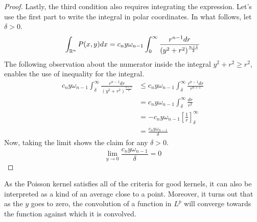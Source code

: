 \begin{proof}
    Lastly, the third condition also requires integrating the expression. Let's use the first part to write the integral in polar coordinates. In what follows, let $\delta>0$.
    \begin{equation*}
        \int_{\mathbb R^n}P(x,y)dx=c_ny\omega_{n-1}\int_0^\infty\frac{r^{n-1}dr}{(y^2+r^2)^{\frac{n+1}{2}}}
    \end{equation*}
    The following observation about the numerator inside the integral $y^2+r^2\geq r^2$, enables the use of inequality for the integral.
    \begin{align*}
        c_ny\omega_{n-1}\int_\delta^\infty\frac{r^{n-1}dr}{(y^2+r^2)^{\frac{n+1}{2}}}&\leq c_ny\omega_{n-1}\int_\delta^\infty\frac{r^{n-1}dr}{r^{n+1}} \\
        &=c_ny\omega_{n-1}\int_\delta^\infty\frac{dr}{r^{2}} \\
        &=-c_ny\omega_{n-1}\left[\frac{1}{r}\right]_\delta^\infty \\
        &=\frac{c_ny\omega_{n-1}}{\delta}
    \end{align*}
    Now, taking the limit shows the claim for any $\delta>0$.
    \begin{equation*}
        \lim_{y\rightarrow0}\frac{c_ny\omega_{n-1}}{\delta}=0
    \end{equation*}
\end{proof}

As the Poisson kernel satisfies all of the criteria for good kernels, it can also be interpreted as a kind of an average close to a point. Moreover, it turns out that as the $y$ goes to zero, the convolution of a function in $L^p$ will converge towards the function against which it is convolved.

\begin{comment}
\begin{lemma}
    If $f\in L^p(\RR^n)$, then $P(\cdot,y)*f$ converges to $f$ in $L^p(\RR^n)$.
\end{lemma}
\begin{proof}
    As $C^\infty_0(\mathbb R^n)$ is dense with respect to $L^p(\mathbb R^n)$, exists a function $f_\epsilon\in C^\infty_0(\mathbb R^n)$ such that for any $\epsilon>0$ holds $\|f-f_\epsilon\|_{L^p(\mathbb R^n)}<\epsilon$.
    For $y>0$
    \begin{align*}
        (f*P(\cdot,y))(x)-f(x)&=\int_{\RR^n}f(x-t)P(t,y)dt-\int_{\RR^n}f(x)P(t,y)dt \\
        &=\int_{\RR^n}(f(x-t)-f(x))P(t,y)dt
    \end{align*}
    So the norm of this can be estimated, and by Minkowski's integral inequality:
    \begin{align*}
        \|f*P-f\|&=\left(\int_{\RR^n}\left|\int_{\RR^n}(f(x-t)-f(x))P(t,y)dt\right|^pdx\right)^{\frac{1}{p}} \\
        &\leq\int_{\RR^n}\left(\int_{\RR^n}|(f(x-t)-f(x))|^pdx\right)^{\frac{1}{p}}P(t,y)dt
    \end{align*}
\end{proof}
\end{comment}


